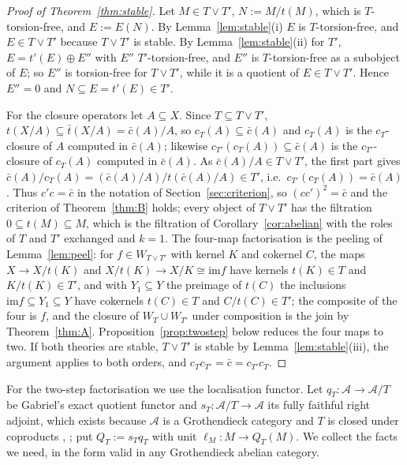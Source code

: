 \documentclass[11pt]{amsart}
\theoremstyle{definition}
\newcommand{\im}{\mathrm{im}}
\begin{document}
\begin{proof}[Proof of Theorem~\ref{thm:stable}]
Let $M\in T\vee T'$, $N:=M/t(M)$, which is $T$-torsion-free, and $E:=E(N)$.
By Lemma~\ref{lem:stable}(i) $E$ is $T$-torsion-free, and $E\in T\vee T'$
because $T\vee T'$ is stable. By Lemma~\ref{lem:stable}(ii) for $T'$,
$E=t'(E)\oplus E''$ with $E''$ $T'$-torsion-free, and $E''$ is
$T$-torsion-free as a subobject of $E$; so $E''$ is torsion-free for
$T\vee T'$, while it is a quotient of $E\in T\vee T'$. Hence $E''=0$ and
$N\subseteq E=t'(E)\in T'$.

For the closure operators let $A\subseteq X$. Since $T\subseteq T\vee T'$,
$t(X/A)\subseteq\bar t(X/A)=\bar c(A)/A$, so $c_T(A)\subseteq\bar c(A)$ and
$c_T(A)$ is the $c_T$-closure of $A$ computed in $\bar c(A)$; likewise
$c_{T'}(c_T(A))\subseteq\bar c(A)$ is the $c_{T'}$-closure of $c_T(A)$
computed in $\bar c(A)$. As $\bar c(A)/A\in T\vee T'$, the first part gives
$\bar c(A)/c_T(A)=(\bar c(A)/A)/t(\bar c(A)/A)\in T'$, i.e.\
$c_{T'}(c_T(A))=\bar c(A)$. Thus $c'c=\bar c$ in the notation of
Section~\ref{sec:criterion}, so $(cc')^2=\bar c$ and the criterion of
Theorem~\ref{thm:B} holds; every object of $T\vee T'$ has the filtration
$0\subseteq t(M)\subseteq M$, which is the filtration of
Corollary~\ref{cor:abelian} with the roles of $T$ and $T'$ exchanged and
$k=1$. The four-map factorisation is the peeling of
Lemma~\ref{lem:peel}: for $f\in W_{T\vee T'}$ with kernel $K$ and cokernel
$C$, the maps $X\to X/t(K)$ and $X/t(K)\to X/K\cong\im f$ have kernels
$t(K)\in T$ and $K/t(K)\in T'$, and with $Y_1\subseteq Y$ the preimage of
$t(C)$ the inclusions $\im f\subseteq Y_1\subseteq Y$ have cokernels
$t(C)\in T$ and $C/t(C)\in T'$; the composite of the four is $f$, and the
closure of $W_T\cup W_{T'}$ under composition is the join by
Theorem~\ref{thm:A}. Proposition~\ref{prop:twostep} below reduces the four
maps to two. If both theories are stable, $T\vee T'$ is stable by
Lemma~\ref{lem:stable}(iii), the argument applies to both orders, and
$c_Tc_{T'}=\bar c=c_{T'}c_T$.
\end{proof}

For the two-step factorisation we use the localisation functor. Let
$q_T\colon\mathcal A\to\mathcal A/T$ be Gabriel's exact quotient functor and
$s_T\colon\mathcal A/T\to\mathcal A$ its fully faithful right adjoint, which
exists because $\mathcal A$ is a Grothendieck category and $T$ is closed
under coproducts \cite[Ch.~III]{Gabriel}, \cite[Ch.~IX--X]{Stenstrom}; put
$Q_T:=s_Tq_T$ with unit $\ell_M\colon M\to Q_T(M)$. We collect the facts we
need, in the form valid in any Grothendieck abelian category.
\end{document}
